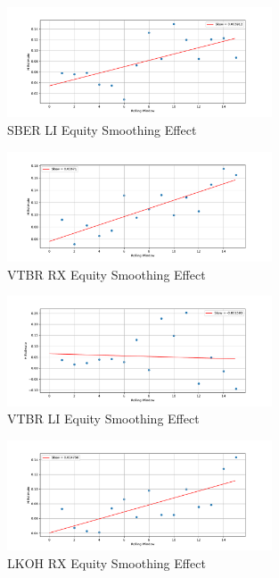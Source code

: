     \begin{figure}[h]
        \centering
        \includegraphics[width=0.7\textwidth]{fig/SBER LI Equity Smoothing Effect.pdf}
        \caption{SBER LI Equity Smoothing Effect}
    \end{figure} 

    \begin{figure}[h]
        \centering
        \includegraphics[width=0.7\textwidth]{fig/VTBR RX Equity Smoothing Effect.pdf}
        \caption{VTBR RX Equity Smoothing Effect}
    \end{figure} 

    \begin{figure}[h]
        \centering
        \includegraphics[width=0.7\textwidth]{fig/VTBR LI Equity Smoothing Effect.pdf}
        \caption{VTBR LI Equity Smoothing Effect}
    \end{figure} 

    \begin{figure}[h]
        \centering
        \includegraphics[width=0.7\textwidth]{fig/LKOH RX Equity Smoothing Effect.pdf}
        \caption{LKOH RX Equity Smoothing Effect}
    \end{figure} 

